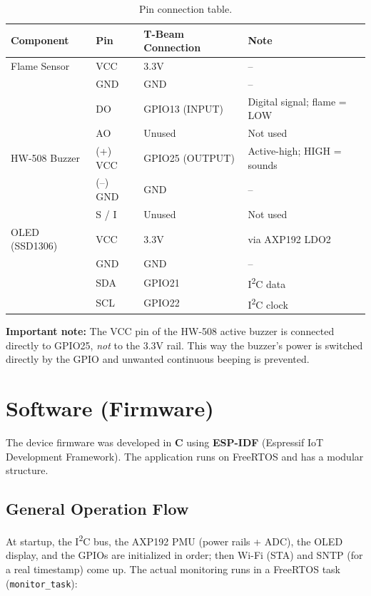 \documentclass[11pt,a4paper]{article}
\begin{document}
\begin{table}[H]
\centering
\caption{Pin connection table.}
\label{tab:pin}
\begin{tabular}{L{3.2cm} L{2.0cm} L{4.0cm} L{4.0cm}}
\toprule
\textbf{Component} & \textbf{Pin} & \textbf{T-Beam Connection} & \textbf{Note}\\
\midrule
Flame Sensor & VCC & 3.3V & --\\
             & GND & GND & --\\
             & DO  & GPIO13 (INPUT) & Digital signal; flame = LOW\\
             & AO  & Unused & Not used\\
\addlinespace
HW-508 Buzzer & (+) VCC & GPIO25 (OUTPUT) & Active-high; HIGH = sounds\\
              & (--) GND & GND & --\\
              & S / I   & Unused & Not used\\
\addlinespace
OLED (SSD1306) & VCC & 3.3V & via AXP192 LDO2\\
               & GND & GND & --\\
               & SDA & GPIO21 & I\textsuperscript{2}C data\\
               & SCL & GPIO22 & I\textsuperscript{2}C clock\\
\bottomrule
\end{tabular}
\end{table}

\noindent\textbf{Important note:} The VCC pin of the HW-508 active buzzer is connected
directly to GPIO25, \emph{not} to the 3.3V rail. This way the buzzer's power is switched
directly by the GPIO and unwanted continuous beeping is prevented.

\section{Software (Firmware)}

The device firmware was developed in \textbf{C} using \textbf{ESP-IDF} (Espressif IoT
Development Framework). The application runs on FreeRTOS and has a modular structure.

\subsection{General Operation Flow}
At startup, the I\textsuperscript{2}C bus, the AXP192 PMU (power rails + ADC), the OLED
display, and the GPIOs are initialized in order; then Wi-Fi (STA) and SNTP (for a real
timestamp) come up. The actual monitoring runs in a FreeRTOS task
(\texttt{monitor\_task}):
\end{document}

